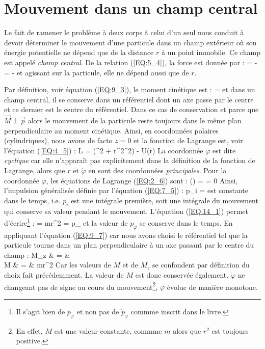 \section{Mouvement dans un champ central}\label{PAR:14}

Le fait de ramener le probl\`eme \`a deux corps \`a celui d'un seul nous conduit \`a devoir d\'eterminer le mouvement d'une particule dans un champ ext\'erieur o\`u son \'energie potentielle ne d\'epend que de la distance $r$ \`a un point immobile. Ce champ est appel\'e \emph{champ central}. De la relation (\ref{EQ:5_4}), la force est donn\'ee par :
\benn
	 = - = -
\eenn
et agissant sur la particule, elle ne d\'epend aussi que de $r$.

Par d\'efinition, voir \'equation (\ref{EQ:9_3}), le moment cin\'etique est :
\benn
	 = \wedge{}
\eenn
et dans un champ central, il se conserve dans un r\'ef\'erentiel dont un axe passe par le centre et ce dernier est le centre du r\'ef\'erentiel. Dans ce cas de conservation et parce que $\vec{M}\perp\vec{p}$ alors le mouvement de la particule reste toujours dans le m\^eme plan perpendiculaire au moment cin\'etique. Ainsi, en coordonn\'ees polaires (cylindriques), nous avons de facto $\dot{z} = 0$ et la fonction de Lagrange est, voir l'\'equation (\ref{EQ:4_5}) :
\be
	L = (^{2} + r^{2}\dot{\varphi}^{2}) - U(r) \label{EQ:14_1}
\ee
La coordonn\'ee $\varphi$ est dite \emph{cyclique} car elle n'appara\^it pas explicitement dans la d\'efinition de la fonction de Lagrange, alors que $r$ et $\dot{\varphi}$ en sont des coordonn\'ees \emph{principales}. Pour la coordonn\'ee $\varphi$, les \'equations de Lagrange (\ref{EQ:2_6}) sont :
\benn
	\left(\right) =  = 0
\eenn
Ainsi, l'impulsion g\'en\'eralis\'ee d\'{e}finie par l'\'equation (\ref{EQ:7_5}) :
\benn
	p_{i} = 
\eenn
est constante dans le temps, i.e. $p_{i}$ est une int\'egrale premi\`ere, soit une int\'egrale du mouvement qui conserve sa valeur pendant le mouvement. L'\'equation (\ref{EQ:14_1}) permet d'\'ecrire\footnote{Il s'agit bien de $p_{\varphi}$ et non pas de $\dot{p}_{\varphi}$ commme inscrit dans le livre.} :
\benn
	 = mr^{2}\dot{\varphi} = p_{\varphi}
\eenn
et la valeur de $p_{\varphi}$ se conserve dans le temps. En appliquant l'\'equation (\ref{EQ:9_7}) car nous avons choisi le r\'ef\'erentiel tel que la particule tourne dans un plan perpendiculaire \`a un axe passant par le centre du champ :
\bea
	M_{z} & = &  \nonumber \\
	\Leftrightarrow M & = & mr^{2}\dot{\varphi} \label{EQ:14_2}
\eea
Car les valeurs de $M$ et de $M_{z}$ se confondent par d\'efinition du choix fait pr\'ec\'edemment. La valeur de $M$ est donc conserv\'ee \'egalement. $\dot{\varphi}$ ne changeant pas de signe au cours du mouvement\footnote{En effet, $M$ est une valeur constante, commme $m$ alors que $r^{2}$ est toujours positive.}, $\varphi$ \'evolue de mani\`ere monotone.

